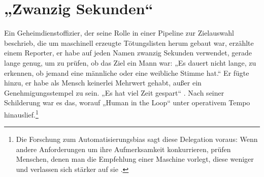 \chapter{„Zwanzig Sekunden“}
\label{sec:1}
Ein Geheimdienstoffizier, der seine Rolle in einer Pipeline zur Zielauswahl beschrieb, die um maschinell erzeugte Tötungslisten herum gebaut war, erzählte einem Reporter, er habe auf jeden Namen zwanzig Sekunden verwendet, gerade lange genug, um zu prüfen, ob das Ziel ein Mann war: „Es dauert nicht lange, zu erkennen, ob jemand eine männliche oder eine weibliche Stimme hat.“ Er fügte hinzu, er habe als Mensch keinerlei Mehrwert gehabt, außer ein Genehmigungsstempel zu sein. „Es hat viel Zeit gespart“ \autocite{abraham2024lavender}. Nach seiner Schilderung war es das, worauf „Human in the Loop“ unter operativem Tempo hinauslief.\footnote{Die Forschung zum Automatisierungsbias sagt diese Delegation voraus: Wenn andere Anforderungen um ihre Aufmerksamkeit konkurrieren, prüfen Menschen, denen man die Empfehlung einer Maschine vorlegt, diese weniger und verlassen sich stärker auf sie \autocite{parasuraman2010complacency}.}

